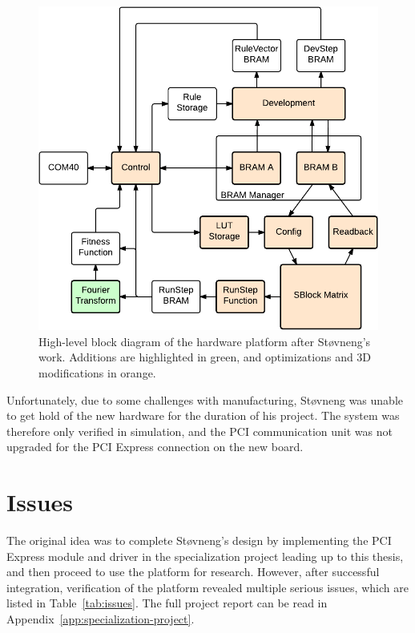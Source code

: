 \begin{figure}[!ht]
    \centering
    \includegraphics[width=42\block]{figures/overview-stovneng}
    \caption[Støvneng's hardware design]{
        High-level block diagram of the hardware platform after Støvneng's work.
        Additions are highlighted in green, and optimizations and 3D modifications in orange.
    }
    \label{fig:overview-stovneng}
\end{figure}

Unfortunately, due to some challenges with manufacturing, Støvneng was unable to get hold of the new hardware for the duration of his project.
The system was therefore only verified in simulation, and the PCI communication unit was not upgraded for the PCI Express connection on the new board.


\section{Issues}


The original idea was to complete Støvneng's design by implementing the PCI Express module and driver in the specialization project leading up to this thesis, and then proceed to use the platform for research.
However, after successful integration, verification of the platform revealed multiple serious issues, which are listed in Table~\ref{tab:issues}.
The full project report can be read in Appendix~\ref{app:specialization-project}.

